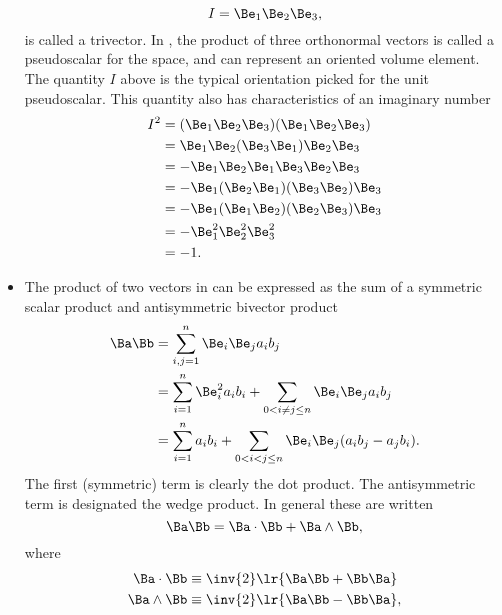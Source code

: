 \begin{itemize}
%
\begin{equation}\label{eqn:gaTutorial:140}
I = \Be_1 \Be_2 \Be_3,
\end{equation}
%
is called a trivector.  In , the product of three orthonormal vectors is called a pseudoscalar for the space, and can represent an oriented volume element.  The quantity \( I \) above is the typical orientation picked for the  unit pseudoscalar.  This quantity also has characteristics of an imaginary number
%
\begin{equation}\label{eqn:gaTutorial:160}
\begin{aligned}
I^2
&=
(\Be_1 \Be_2 \Be_3)
(\Be_1 \Be_2 \Be_3)
\\ &=
\Be_1 \Be_2 (\Be_3
\Be_1) \Be_2 \Be_3
\\ &=
-\Be_1 \Be_2 \Be_1
\Be_3 \Be_2 \Be_3
\\ &=
-\Be_1 (\Be_2 \Be_1)
(\Be_3 \Be_2) \Be_3
\\ &=
-\Be_1 (\Be_1 \Be_2)
(\Be_2 \Be_3) \Be_3
\\ &=
-
\Be_1^2
\Be_2^2
\Be_3^2
\\ &=
-1.
\end{aligned}
\end{equation}
%
\item The product of two vectors in  can be expressed as the sum of a symmetric scalar product and antisymmetric bivector product
%
\begin{equation}\label{eqn:gaTutorial:480}
\begin{aligned}
\Ba \Bb
&=
\sum_{i,j = 1}^n \Be_i \Be_j a_i b_j
\\ &=
\sum_{i = 1}^n \Be_i^2 a_i b_i
+
\sum_{0 < i \ne j \le n} \Be_i \Be_j a_i b_j
\\ &=
\sum_{i = 1}^n a_i b_i
+
\sum_{0 < i < j \le n} \Be_i \Be_j (a_i b_j - a_j b_i).
\end{aligned}
\end{equation}
%
The first (symmetric) term is clearly the dot product.  The antisymmetric term is designated the wedge product.  In general these are written
%
\begin{equation}\label{eqn:gaTutorial:500}
\Ba \Bb = \Ba \cdot \Bb + \Ba \wedge \Bb,
\end{equation}
where
\begin{equation}\label{eqn:gaTutorial:520}
\begin{aligned}
\Ba \cdot \Bb &\equiv \inv{2} \lr{ \Ba \Bb + \Bb \Ba } \\
\Ba \wedge \Bb &\equiv \inv{2} \lr{ \Ba \Bb - \Bb \Ba },
\end{aligned}

\end{equation}
\end{itemize}
